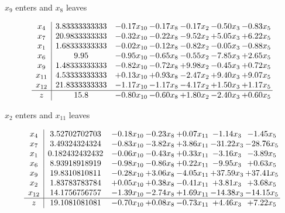 \documentclass[8pt]{article}
\begin{document}
 $ x_{9} $ enters and $ x_{8} $ leaves 

 \[\begin{array}{c| c c@{\hskip 2pt} c@{\hskip 2pt} c@{\hskip 2pt} c@{\hskip 2pt} c@{\hskip 2pt} }
 x_{4}   &  3.83333333333 & -0.17 x_{10} & -0.17 x_{8} & -0.17 x_{2} & -0.50 x_{3} & -0.83 x_{5}\\
 x_{7}   &  20.9833333333 & -0.32 x_{10} & -0.22 x_{8} & -9.52 x_{2} & +  5.05 x_{3} & +  6.22 x_{5}\\
 x_{1}   &  1.68333333333 & -0.02 x_{10} & -0.12 x_{8} & -0.82 x_{2} & -0.05 x_{3} & -0.88 x_{5}\\
 x_{6}   &  9.95 & -0.95 x_{10} & -0.65 x_{8} & -0.55 x_{2} & -7.85 x_{3} & +  2.65 x_{5}\\
 x_{9}   &  1.48333333333 & -0.82 x_{10} & -0.72 x_{8} & +  9.98 x_{2} & -0.45 x_{3} & +  0.72 x_{5}\\
 x_{11}   &  4.53333333333 & +  0.13 x_{10} & +  0.93 x_{8} & -2.47 x_{2} & +  9.40 x_{3} & +  9.07 x_{5}\\
 x_{12}   &  21.8333333333 & -1.17 x_{10} & -1.17 x_{8} & -4.17 x_{2} & +  1.50 x_{3} & +  1.17 x_{5}\\
\hline
z    &  15.8 & -0.80 x_{10} & -0.60 x_{8} & +  1.80 x_{2} & -2.40 x_{3} & +  0.60 x_{5}\\
\end{array}\]


 $ x_{2} $ enters and $ x_{11} $ leaves 

 \[\begin{array}{c| c c@{\hskip 2pt} c@{\hskip 2pt} c@{\hskip 2pt} c@{\hskip 2pt} c@{\hskip 2pt} }
 x_{4}   &  3.52702702703 & -0.18 x_{10} & -0.23 x_{8} & +  0.07 x_{11} & -1.14 x_{3} & -1.45 x_{5}\\
 x_{7}   &  3.49324324324 & -0.83 x_{10} & -3.82 x_{8} & +  3.86 x_{11} & -31.22 x_{3} & -28.76 x_{5}\\
 x_{1}   &  0.182432432432 & -0.06 x_{10} & -0.43 x_{8} & +  0.33 x_{11} & -3.16 x_{3} & -3.89 x_{5}\\
 x_{6}   &  8.93918918919 & -0.98 x_{10} & -0.86 x_{8} & +  0.22 x_{11} & -9.95 x_{3} & +  0.63 x_{5}\\
 x_{9}   &  19.8310810811 & -0.28 x_{10} & +  3.06 x_{8} & -4.05 x_{11} & + 37.59 x_{3} & + 37.41 x_{5}\\
 x_{2}   &  1.83783783784 & +  0.05 x_{10} & +  0.38 x_{8} & -0.41 x_{11} & +  3.81 x_{3} & +  3.68 x_{5}\\
 x_{12}   &  14.1756756757 & -1.39 x_{10} & -2.74 x_{8} & +  1.69 x_{11} & -14.38 x_{3} & -14.15 x_{5}\\
\hline
z    &  19.1081081081 & -0.70 x_{10} & +  0.08 x_{8} & -0.73 x_{11} & +  4.46 x_{3} & +  7.22 x_{5}\\
\end{array}\]
\end{document}
